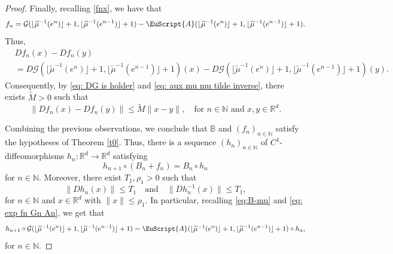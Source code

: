 \documentclass[reqno, a4paper, 10pt]{amsart}
\theoremstyle{plain}
\numberwithin{equation}{section}
\theoremstyle{remark}
\def\N{\mathbb{N}}
\def\cA{\EuScript{A}}
\def\R{\mathbb{R}}
\begin{document}
\begin{proof}
Finally, recalling \eqref{fnx}, we have that 
\begin{equation}\label{eq: exp fn Gn An}
f_n=\mathcal G(\lfloor \widetilde{\mu}^{-1}(e^{n})\rfloor+1, \lfloor \widetilde{\mu}^{-1}(e^{n-1})\rfloor+1)-\cA(\lfloor \widetilde{\mu}^{-1}(e^{n})\rfloor+1, \lfloor \widetilde{\mu}^{-1}(e^{n-1})\rfloor+1).
\end{equation}
Thus,
\begin{equation*}\label{Dfnxy}
\begin{split}
&Df_n(x)-Df_n(y)\\
&=D\mathcal G(\lfloor \widetilde{\mu}^{-1}(e^{n})\rfloor+1, \lfloor \widetilde{\mu}^{-1}(e^{n-1})\rfloor+1)(x)-D\mathcal G(\lfloor \widetilde{\mu}^{-1}(e^{n})\rfloor+1, \lfloor \widetilde{\mu}^{-1}(e^{n-1})\rfloor+1)(y).
\end{split}
\end{equation*}
Consequently, by \eqref{eq: DG is holder} and \eqref{eq: aux mu mu tilde inverse}, there exists $\tilde M>0$ such that 
\[
\|Df_n(x)-Df_n(y)\| \le \tilde M\|x-y\|, \quad \text{for $n\in \N$ and $x, y\in \R^d$.}
\]

Combining the previous observations, we conclude that $\mathbb B$ and $(f_n)_{n\in \N}$ satisfy the hypotheses of Theorem \ref{t0}. Thus, there is a sequence $(h_n)_{n\in \N}$ of $C^1$-diffeomorphisms $h_n\colon \R^d \to \R^d$ satisfying
\begin{equation}\label{LIN-proof}
    h_{n+1}\circ (B_n+f_n)=B_n\circ h_n
\end{equation}
for $n\in \N$. Moreover, there exist $T_1, \rho_1>0$ such that 
\begin{equation}\label{psi-1}
\|Dh_n(x)\| \le T_1 \quad \text{and} \quad \|Dh_n^{-1}(x)\| \le T_1,
\end{equation}
for $n\in \N$ and $x\in \R^d$ with $\|x\|\le \rho_1$.
In particular, recalling \eqref{eq:B-mu} and \eqref{eq: exp fn Gn An}, we get that
\begin{equation}\label{lin}
    h_{n+1}\circ \mathcal G(\lfloor \widetilde{\mu}^{-1}(e^{n})\rfloor+1, \lfloor \widetilde{\mu}^{-1}(e^{n-1})\rfloor+1)=\cA (\lfloor \widetilde{\mu}^{-1}(e^{n})\rfloor+1, \lfloor \widetilde{\mu}^{-1}(e^{n-1})\rfloor+1)\circ h_n,
\end{equation}
for $n \in \mathbb N$.



\end{proof}
\end{document}
